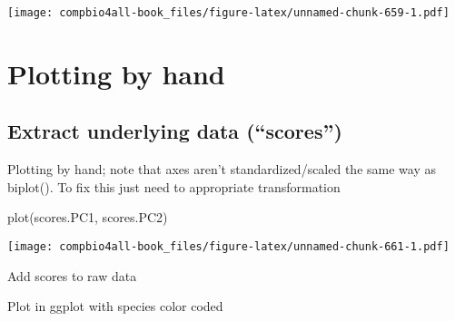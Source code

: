 \documentclass[
]{book}
\newenvironment{Shaded}{\begin{snugshade}}{\end{snugshade}}
\newcommand{\FunctionTok}[1]{\textcolor[rgb]{0.00,0.00,0.00}{#1}}
\newcommand{\NormalTok}[1]{#1}
\newcommand{\OtherTok}[1]{\textcolor[rgb]{0.56,0.35,0.01}{#1}}
\newcommand{\SpecialCharTok}[1]{\textcolor[rgb]{0.00,0.00,0.00}{#1}}
\newcommand{\StringTok}[1]{\textcolor[rgb]{0.31,0.60,0.02}{#1}}
\begin{document}
\texttt{[image: compbio4all-book\_files/figure-latex/unnamed-chunk-659-1.pdf]}

\hypertarget{plotting-by-hand}{%
\section{Plotting by hand}\label{plotting-by-hand}}

\hypertarget{extract-underlying-data-scores}{%
\subsection{Extract underlying data (``scores'')}\label{extract-underlying-data-scores}}

\begin{Shaded}
\end{Shaded}

Plotting by hand; note that axes aren't standardized/scaled the same way as biplot(). To fix this just need to appropriate transformation

\begin{Shaded}
\begin{Highlighting}[]
\FunctionTok{plot}\NormalTok{(scores.PC1,}
\NormalTok{     scores.PC2)}
\end{Highlighting}
\end{Shaded}

\texttt{[image: compbio4all-book\_files/figure-latex/unnamed-chunk-661-1.pdf]}

Add scores to raw data

\begin{Shaded}
\end{Shaded}

Plot in ggplot with species color coded
\end{document}
